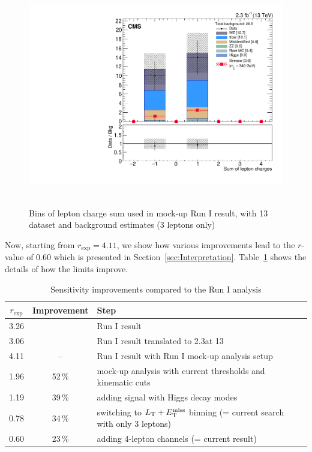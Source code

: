\begin{figure}[h]
\begin{center}
	\includegraphics[width=.7\textwidth]{Appendix/L3Tau0_Q}\
	\caption{Bins of lepton charge sum used in mock-up Run I result, with 13\,\TeV dataset and background estimates (3 leptons only)
	\label{fig:app:RunI}}
\end{center}
\end{figure}

Now, starting from $r_\textrm{exp} = 4.11$, we show how various improvements lead to the $r$-value of 0.60 which is presented in Section~\ref{sec:Interpretation}. Table~\ref{tab:improvements} shows the details of how the limits improve.

\begin{table}[h]
\centering
\caption{Sensitivity improvements compared to the Run I analysis} \label{tab:improvements}
\begin{tabular}{c c l}
\hline\hline
$r_\textrm{exp}$ & Improvement & Step \\
\hline
\hline
3.26 & & Run I result \\
3.06 & & Run I result translated to 2.3\fbinv at 13\,\TeV\\
\hline
4.11 & -- & Run I result with Run I mock-up analysis setup \\
1.96 & 52\,\% & mock-up analysis with current \pt thresholds and kinematic cuts \\
1.19 & 39\,\% & adding signal with Higgs decay modes \\
0.78 & 34\,\% & switching to $L_\textrm{T} + E_{\mathrm{T}}^{\text{miss}}$ binning (= current search with only 3 leptons) \\
0.60 & 23\,\% & adding 4-lepton channels (= current result) \\
\end{tabular}
\end{table}
